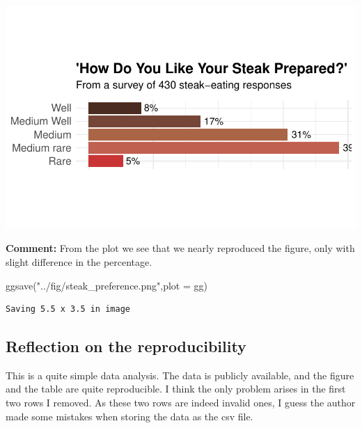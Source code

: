 \documentclass[
  letterpaper,
  DIV=11,
  numbers=noendperiod]{scrartcl}
\newenvironment{Shaded}{\begin{snugshade}}{\end{snugshade}}
\newcommand{\AttributeTok}[1]{\textcolor[rgb]{0.40,0.45,0.13}{#1}}
\newcommand{\FunctionTok}[1]{\textcolor[rgb]{0.28,0.35,0.67}{#1}}
\newcommand{\NormalTok}[1]{\textcolor[rgb]{0.00,0.23,0.31}{#1}}
\newcommand{\StringTok}[1]{\textcolor[rgb]{0.13,0.47,0.30}{#1}}
\begin{document}
\includegraphics{steak_analysis_files/figure-pdf/unnamed-chunk-7-1.pdf}

\textbf{Comment:} From the plot we see that we nearly reproduced the
figure, only with slight difference in the percentage.

\begin{Shaded}
\begin{Highlighting}[]
\FunctionTok{ggsave}\NormalTok{(}\StringTok{"../fig/steak\_preference.png"}\NormalTok{,}\AttributeTok{plot =}\NormalTok{ gg)}
\end{Highlighting}
\end{Shaded}

\begin{verbatim}
Saving 5.5 x 3.5 in image
\end{verbatim}

\subsection{Reflection on the
reproducibility}\label{reflection-on-the-reproducibility}

This is a quite simple data analysis. The data is publicly available,
and the figure and the table are quite reproducible. I think the only
problem arises in the first two rows I removed. As these two rows are
indeed invalid ones, I guess the author made some mistakes when storing
the data as the csv file.
\end{document}
